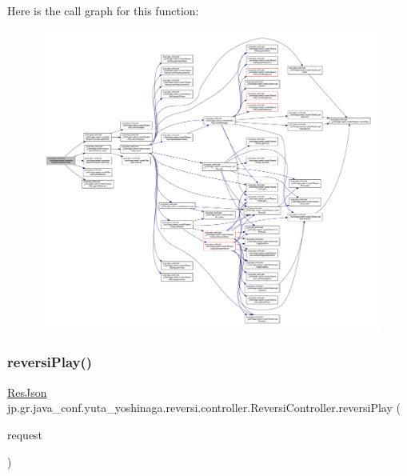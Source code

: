 Here is the call graph for this function\+:
\nopagebreak
\begin{figure}[H]
\begin{center}
\leavevmode
\includegraphics[width=350pt]{classjp_1_1gr_1_1java__conf_1_1yuta__yoshinaga_1_1reversi_1_1controller_1_1_reversi_controller_a7f9b86ce3c02d16c8bb08adbcfda6957_cgraph}
\end{center}
\end{figure}
\mbox{\label{classjp_1_1gr_1_1java__conf_1_1yuta__yoshinaga_1_1reversi_1_1controller_1_1_reversi_controller_a3c9b089c78395e6a87cf873816a2f50d}} 
\subsubsection{\texorpdfstring{reversi\+Play()}{reversiPlay()}}
{\footnotesize\ttfamily \hyperlink{classjp_1_1gr_1_1java__conf_1_1yuta__yoshinaga_1_1reversi_1_1model_1_1_res_json}{Res\+Json} jp.\+gr.\+java\+\_\+conf.\+yuta\+\_\+yoshinaga.\+reversi.\+controller.\+Reversi\+Controller.\+reversi\+Play (\begin{DoxyParamCaption}\item[{Http\+Servlet\+Request}]{request }\end{DoxyParamCaption})}



